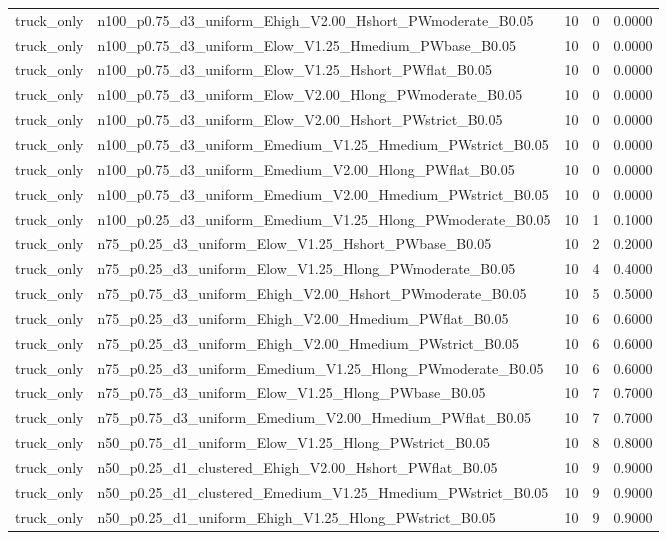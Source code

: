\begin{tabular}{llrrr}
truck_only & n100_p0.75_d3_uniform_Ehigh_V2.00_Hshort_PWmoderate_B0.05 & 10 & 0 & 0.0000 \\
truck_only & n100_p0.75_d3_uniform_Elow_V1.25_Hmedium_PWbase_B0.05 & 10 & 0 & 0.0000 \\
truck_only & n100_p0.75_d3_uniform_Elow_V1.25_Hshort_PWflat_B0.05 & 10 & 0 & 0.0000 \\
truck_only & n100_p0.75_d3_uniform_Elow_V2.00_Hlong_PWmoderate_B0.05 & 10 & 0 & 0.0000 \\
truck_only & n100_p0.75_d3_uniform_Elow_V2.00_Hshort_PWstrict_B0.05 & 10 & 0 & 0.0000 \\
truck_only & n100_p0.75_d3_uniform_Emedium_V1.25_Hmedium_PWstrict_B0.05 & 10 & 0 & 0.0000 \\
truck_only & n100_p0.75_d3_uniform_Emedium_V2.00_Hlong_PWflat_B0.05 & 10 & 0 & 0.0000 \\
truck_only & n100_p0.75_d3_uniform_Emedium_V2.00_Hmedium_PWstrict_B0.05 & 10 & 0 & 0.0000 \\
truck_only & n100_p0.25_d3_uniform_Emedium_V1.25_Hlong_PWmoderate_B0.05 & 10 & 1 & 0.1000 \\
truck_only & n75_p0.25_d3_uniform_Elow_V1.25_Hshort_PWbase_B0.05 & 10 & 2 & 0.2000 \\
truck_only & n75_p0.25_d3_uniform_Elow_V1.25_Hlong_PWmoderate_B0.05 & 10 & 4 & 0.4000 \\
truck_only & n75_p0.75_d3_uniform_Ehigh_V2.00_Hshort_PWmoderate_B0.05 & 10 & 5 & 0.5000 \\
truck_only & n75_p0.25_d3_uniform_Ehigh_V2.00_Hmedium_PWflat_B0.05 & 10 & 6 & 0.6000 \\
truck_only & n75_p0.25_d3_uniform_Ehigh_V2.00_Hmedium_PWstrict_B0.05 & 10 & 6 & 0.6000 \\
truck_only & n75_p0.25_d3_uniform_Emedium_V1.25_Hlong_PWmoderate_B0.05 & 10 & 6 & 0.6000 \\
truck_only & n75_p0.75_d3_uniform_Elow_V1.25_Hlong_PWbase_B0.05 & 10 & 7 & 0.7000 \\
truck_only & n75_p0.75_d3_uniform_Emedium_V2.00_Hmedium_PWflat_B0.05 & 10 & 7 & 0.7000 \\
truck_only & n50_p0.75_d1_uniform_Elow_V1.25_Hlong_PWstrict_B0.05 & 10 & 8 & 0.8000 \\
truck_only & n50_p0.25_d1_clustered_Ehigh_V2.00_Hshort_PWflat_B0.05 & 10 & 9 & 0.9000 \\
truck_only & n50_p0.25_d1_clustered_Emedium_V1.25_Hmedium_PWstrict_B0.05 & 10 & 9 & 0.9000 \\
truck_only & n50_p0.25_d1_uniform_Ehigh_V1.25_Hlong_PWstrict_B0.05 & 10 & 9 & 0.9000 \\

\end{tabular}
